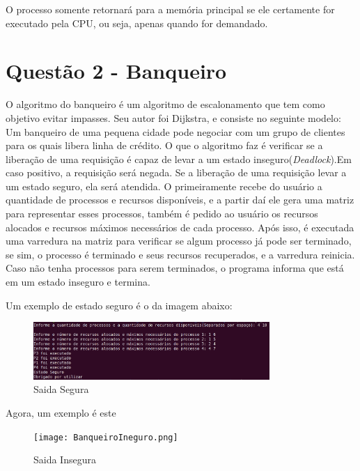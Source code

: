 \documentclass[12pt]{report}
\begin{document}
{\begin{enumerate}
    O processo somente retornará para a memória principal se ele certamente for executado pela CPU, ou seja, apenas quando for demandado.
\end{enumerate}

\section{Questão 2 - Banqueiro}
 O algoritmo do banqueiro é um algoritmo de escalonamento que tem como objetivo evitar impasses. Seu autor foi Dijkstra, e consiste no seguinte modelo: Um banqueiro de uma pequena cidade pode negociar com um grupo de clientes para os quais libera linha de crédito. O que o algoritmo faz é verificar se a liberação de uma requisição é capaz de levar a um estado inseguro(\textit{Deadlock}).Em caso positivo, a requisição será negada. Se a liberação de uma requisição levar a um estado seguro, ela será atendida. O primeiramente recebe do usuário a quantidade de processos e recursos disponíveis, e a partir daí ele gera uma matriz para representar esses processos, também é pedido ao usuário os recursos alocados e recursos máximos necessários de cada processo. Após isso, é executada uma varredura na matriz para verificar se algum processo já pode ser terminado, se sim, o processo é terminado e seus recursos recuperados, e a varredura reinicia. Caso não tenha processos para serem terminados, o programa informa que está em um estado inseguro e termina.
 
 Um exemplo de estado seguro é o da imagem abaixo:
 \begin{figure}[!ht]
	\centering
	\includegraphics[width=0.8\textwidth]{BanqueiroSeguro.png}
	\caption{Saida Segura}
	\centering
	\label{label:file_name}
\end{figure}
Agora, um exemplo é este
\begin{figure}[!ht]
	\centering
	\texttt{[image: BanqueiroIneguro.png]}
	\caption{Saida Insegura}
	\centering
	\label{label:file_name}
\end{figure}

}
\end{document}
